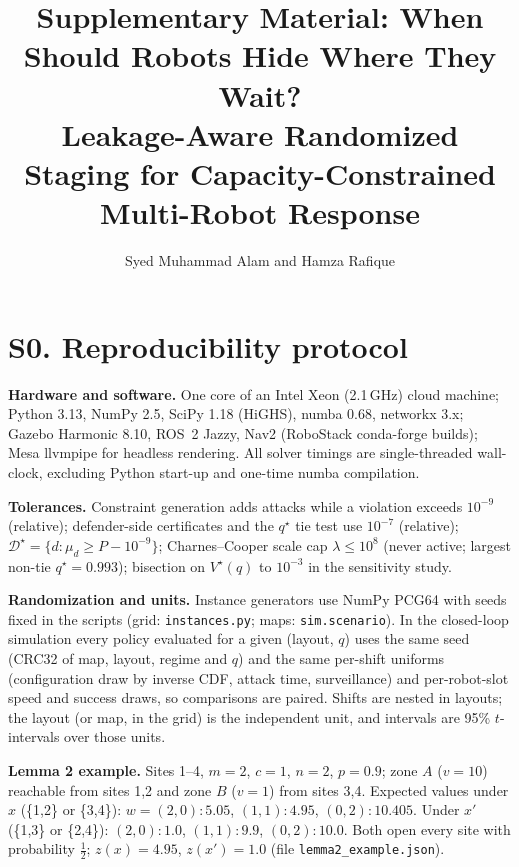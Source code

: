 \documentclass[letterpaper,onecolumn,draftclsnofoot]{IEEEtran}
\newcommand{\D}{\mathcal{D}}
\begin{document}
\sloppy
\title{Supplementary Material: When Should Robots Hide Where They Wait?\\ Leakage-Aware Randomized Staging for Capacity-Constrained Multi-Robot Response}
\author{Syed Muhammad Alam and Hamza Rafique}
\maketitle
\thispagestyle{empty}\pagestyle{empty}  %

\section*{S0. Reproducibility protocol}
\textbf{Hardware and software.} One core of an Intel Xeon (2.1\,GHz) cloud machine; Python 3.13, NumPy 2.5, SciPy 1.18 (HiGHS), numba 0.68, networkx 3.x; Gazebo Harmonic 8.10, ROS~2 Jazzy, Nav2 (RoboStack conda-forge builds); Mesa llvmpipe for headless rendering. All solver timings are single-threaded wall-clock, excluding Python start-up and one-time numba compilation.

\textbf{Tolerances.} Constraint generation adds attacks while a violation exceeds $10^{-9}$ (relative); defender-side certificates and the $q^\star$ tie test use $10^{-7}$ (relative); $\D^\star=\{d:\mu_d\ge P-10^{-9}\}$; Charnes--Cooper scale cap $\lambda\le10^8$ (never active; largest non-tie $q^\star=0.993$); bisection on $V^\star(q)$ to $10^{-3}$ in the sensitivity study.

\textbf{Randomization and units.} Instance generators use NumPy PCG64 with seeds fixed in the scripts (grid: \texttt{instances.py}; maps: \texttt{sim.scenario}). In the closed-loop simulation every policy evaluated for a given (layout, $q$) uses the same seed (CRC32 of map, layout, regime and $q$) and the same per-shift uniforms (configuration draw by inverse CDF, attack time, surveillance) and per-robot-slot speed and success draws, so comparisons are paired. Shifts are nested in layouts; the layout (or map, in the grid) is the independent unit, and intervals are 95\% $t$-intervals over those units.

\textbf{Lemma 2 example.} Sites 1--4, $m=2$, $c=1$, $n=2$, $p=0.9$; zone $A$ ($v=10$) reachable from sites 1,2 and zone $B$ ($v=1$) from sites 3,4. Expected values under $x$ (\{1,2\} or \{3,4\}): $w=(2,0)\colon5.05$, $(1,1)\colon4.95$, $(0,2)\colon10.405$. Under $x'$ (\{1,3\} or \{2,4\}): $(2,0)\colon1.0$, $(1,1)\colon9.9$, $(0,2)\colon10.0$. Both open every site with probability $\tfrac12$; $z(x)=4.95$, $z(x')=1.0$ (file \texttt{lemma2\_example.json}).
\end{document}
